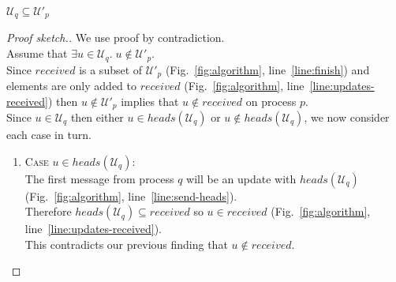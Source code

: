 \documentclass[manuscript,anonymous]{acmart}
\begin{document}
\begin{lemma}\label{lemma:no-q-missing}
$\mathcal{U}_q \subseteq \mathcal{U}'_p$
\end{lemma}
\begin{proof}[Proof sketch.]
We use proof by contradiction.\\
Assume that $\exists u \in \mathcal{U}_q.\; u \notin  \mathcal{U}'_p$.\\
Since $\mathit{received}$ is a subset of $\mathcal{U}'_p$ (Fig.~\ref{fig:algorithm}, line~\ref{line:finish}) and elements are only added to $\mathit{received}$ (Fig.~\ref{fig:algorithm}, line~\ref{line:updates-received}) then $u \notin  \mathcal{U}'_p$ implies that $u \notin \mathit{received}$ on process $p$.\\
Since $u \in \mathcal{U}_q$ then either $u \in \mathit{heads}(\mathcal{U}_q)$ or $u \notin \mathit{heads}(\mathcal{U}_q)$, we now consider each case in turn.
\begin{enumerate}
    \item\textsc{Case} $u \in heads(\mathcal{U}_q)$:\\
    The first message from process $q$ will be an update with $\mathit{heads}(\mathcal{U}_q)$ (Fig.~\ref{fig:algorithm}, line~\ref{line:send-heads}).\\
    Therefore $\mathit{heads}(\mathcal{U}_q) \subseteq \mathit{received}$ so $u \in \mathit{received}$ (Fig.~\ref{fig:algorithm}, line~\ref{line:updates-received}).\\
    This contradicts our previous finding that $u \notin \mathit{received}$.
    

\end{enumerate}
\end{proof}
\end{document}

